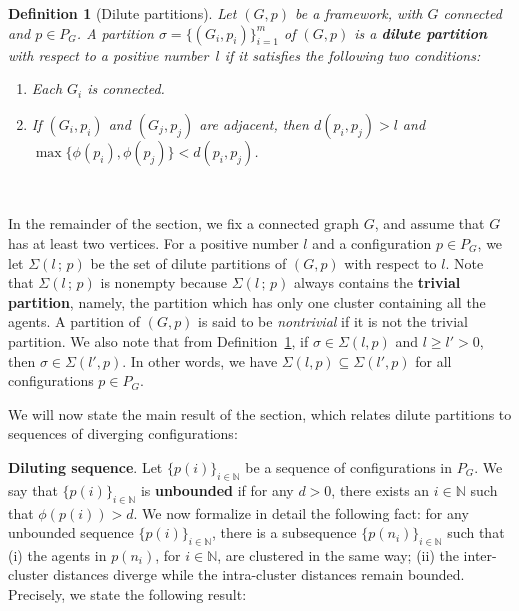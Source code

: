 \documentclass[10pt,twocolumn,twoside]{IEEEtran}
\newtheorem{Definition}{Definition}
\renewcommand{\(}{\left (}
\renewcommand{\)}{\right )}
\renewcommand{\;}{\,;\,}
\newcommand{\N}{\mathbb{N}}
\begin{document}
\begin{Definition}[Dilute partitions]\label{def:dilutepartition}
Let $(G, p)$ be a framework, with $G$ connected and $p\in P_G$. 
A partition $\sigma = \{(G_i, p_i)\}^m_{i=1}$ of $(G,p)$ is a \textbf{dilute partition} with respect to a positive number~$l$ if it satisfies the following two conditions:
\begin{enumerate}
\item Each $G_i$ is connected. 
\item If $(G_i,p_i)$ and $(G_j,p_j)$ are adjacent, then  
$d(p_i,p_j) > l$ and ${\max\{\phi(p_i), \phi(p_j)\}} < {d(p_i,p_j)}$.  
\end{enumerate}\,
\end{Definition}





In the remainder of the section, we fix a connected graph $G$, and assume that $G$ has at least two vertices. 
For a positive number $l$ and a configuration $p\in P_G$, we let $\Sigma(l\; p)$ be the set of dilute partitions of $(G,p)$ with respect to $l$.  
Note that $\Sigma(l\; p)$ is nonempty because $\Sigma(l\; p)$ always contains the {\bf trivial partition}, namely,  the partition which has only one cluster containing all the agents. A partition of $(G,p)$ is said to be {\it nontrivial} if it is not the trivial partition. 
We also note that from Definition~\ref{def:dilutepartition}, if $\sigma \in \Sigma(l,p)$ and $l \ge l' >0$, then $\sigma \in \Sigma(l',p)$. In other words, we have $\Sigma(l,p) \subseteq \Sigma(l',p)$ for all configurations $p\in P_G$. 


We will now state the main result of the section, which relates dilute partitions to sequences of diverging configurations: 














\vspace{3pt}
\noindent
{\bf Diluting sequence}. 
Let $\{p(i)\}_{i\in\N}$ be a sequence of configurations in $P_G$. We say that $\{p(i)\}_{i\in\N}$ is {\bf unbounded} if for any $d > 0$, there exists an $i\in\N$ such that $\phi(p(i)) > d$.  
We now formalize in detail the following fact: for any unbounded sequence $\{p(i)\}_{i\in\N}$, there is a subsequence $\{p(n_i)\}_{i\in\N}$ such that (i) the agents in $p(n_i)$, for $i\in\N$, are clustered in the same way; (ii) the inter-cluster distances diverge while the intra-cluster distances remain bounded. Precisely, we state the following result:
\end{document}
